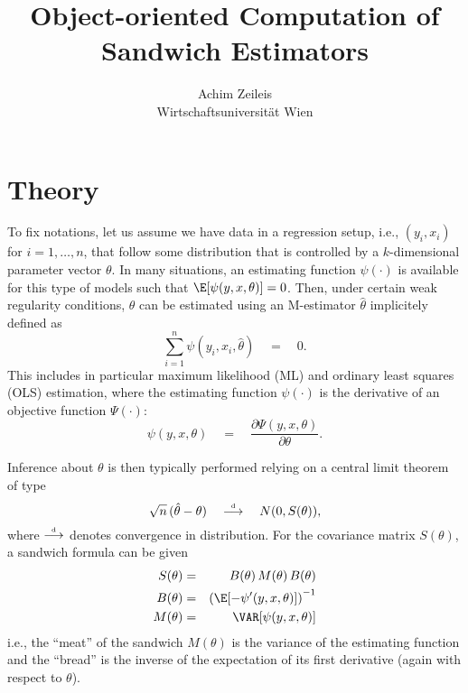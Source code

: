 \documentclass{Z}
\author{Achim Zeileis\\Wirtschaftsuniversit\"at Wien}
\title{Object-oriented Computation of Sandwich Estimators}
\newcommand{\darrow}{\stackrel{\mbox{\tiny \textnormal{d}}}{\longrightarrow}}
\begin{document}


\section{Theory}

To fix notations, let us assume we have data in a regression setup, i.e., 
$(y_i, x_i)$ for $i = 1, \dots, n$, that follow some distribution that is 
controlled by a $k$-dimensional parameter vector $\theta$. In many situations,
an estimating function $\psi(\cdot)$ is available for this type of models
such that $\E[\psi(y, x, \theta)] = 0$. Then, under certain weak regularity
conditions, $\theta$ can be estimated using an M-estimator $\hat \theta$
implicitely defined as
  \begin{equation}
    \sum_{i = 1}^n \psi(y_i, x_i, \hat \theta) \quad = \quad 0.
  \end{equation}
This includes in particular maximum likelihood (ML) and ordinary least
squares (OLS) estimation, where the estimating function $\psi(\cdot)$ is
the derivative of an objective function $\Psi(\cdot)$:
  \begin{equation}
    \psi(y, x, \theta) \quad = \quad \frac{\partial \Psi(y, x, \theta)}{\partial \theta}.
  \end{equation}

Inference about $\theta$ is then typically performed relying on a central
limit theorem of type
  \begin{equation}
    \sqrt{n} \, (\hat \theta - \theta) \quad \darrow \quad N(0, S(\theta)),
  \end{equation}
where $\darrow$ denotes convergence in distribution. For the covariance matrix
$S(\theta)$, a sandwich formula can be given
\begin{eqnarray}
  S(\theta) & = & B(\theta) \, M(\theta) \, B(\theta) \\
  B(\theta) & = & \left( \E[ - \psi'(y, x, \theta) ] \right)^{-1} \\
  M(\theta) & = & \VAR[ \psi(y, x, \theta) ]
\end{eqnarray}
i.e., the ``meat'' of the sandwich $M(\theta)$ is the variance of the estimating
function and the ``bread'' is the inverse of the expectation of its first derivative
(again with respect to $\theta$).
\end{document}
